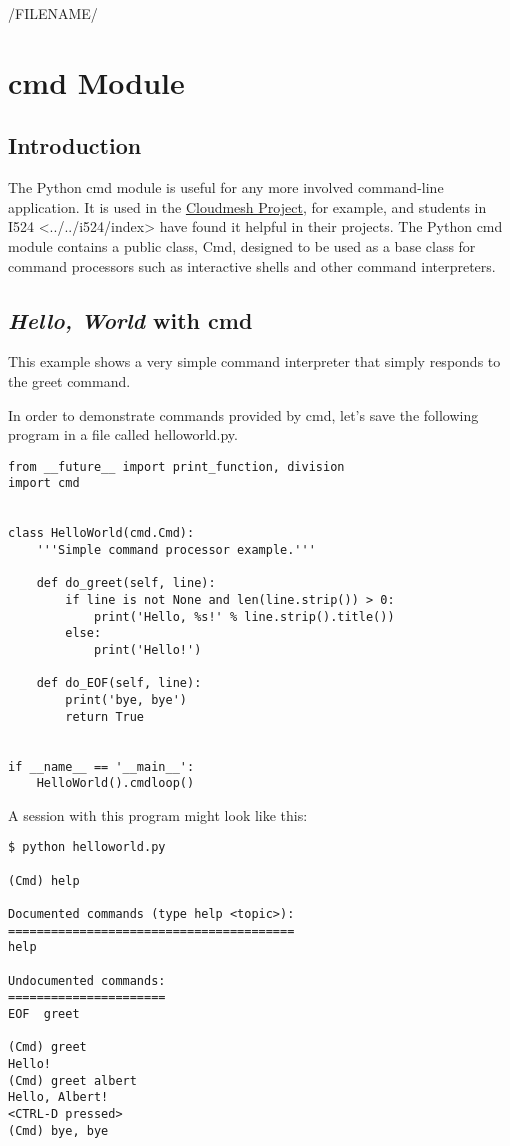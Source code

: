 /FILENAME/
\section{cmd Module}\label{cmd-module}

\subsection{Introduction}\label{introduction}

The Python cmd module is useful for any more involved command-line
application. It is used in the
\href{http://cloudmesh.github.io/}{Cloudmesh Project}, for example, and
students in I524
\textless{}../../i524/index\textgreater{} have found it helpful in their
projects. The Python cmd module contains a public class, Cmd, designed
to be used as a base class for command processors such as interactive
shells and other command interpreters.

\subsection{\texorpdfstring{\emph{Hello, World} with
cmd}{Hello, World with cmd}}\label{hello-world-with-cmd}

This example shows a very simple command interpreter that simply
responds to the greet command.

In order to demonstrate commands provided by cmd, let's save the
following program in a file called helloworld.py.

\begin{lstlisting}
from __future__ import print_function, division
import cmd


class HelloWorld(cmd.Cmd):
    '''Simple command processor example.'''

    def do_greet(self, line):
        if line is not None and len(line.strip()) > 0:
            print('Hello, %s!' % line.strip().title())
        else:
            print('Hello!')

    def do_EOF(self, line):
        print('bye, bye')
        return True


if __name__ == '__main__':
    HelloWorld().cmdloop()
\end{lstlisting}

A session with this program might look like this:

\begin{lstlisting}
$ python helloworld.py

(Cmd) help

Documented commands (type help <topic>):
========================================
help

Undocumented commands:
======================
EOF  greet

(Cmd) greet
Hello!
(Cmd) greet albert
Hello, Albert!
<CTRL-D pressed>
(Cmd) bye, bye
\end{lstlisting}

